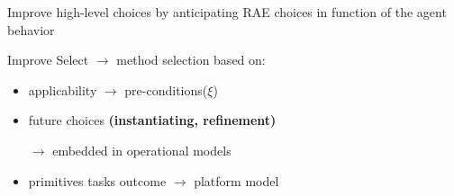 \begin{frame}{Improve high-level choices by anticipating RAE choices in function of the agent behavior}

    Improve Select $\rightarrow$ method selection based on:
    \begin{itemize}
        \item applicability $\rightarrow$ pre-conditions($\xi$)
        \item future choices \textbf{(instantiating, refinement)}
        
        $\rightarrow$ embedded in operational models
        \item primitives tasks outcome $\rightarrow$ platform model
    \end{itemize}

\end{frame}
